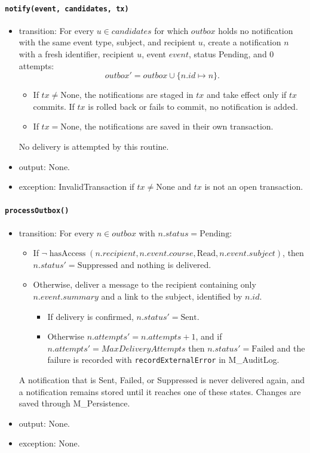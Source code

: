 \documentclass[12pt, titlepage]{article}
\begin{document}
\paragraph{\texttt{notify(event, candidates, tx)}}
\begin{itemize}
    \item transition: For every $u\in candidates$ for which $\mathit{outbox}$ holds no notification with
    the same event type, subject, and recipient $u$, create a notification $n$ with a fresh identifier,
    recipient $u$, event $event$, status Pending, and 0 attempts:
    \[
        \mathit{outbox}'=\mathit{outbox}\cup\{n.id\mapsto n\}.
    \]
    \begin{itemize}
        \item If $tx\ne\text{None}$, the notifications are staged in $tx$ and take effect only if $tx$ commits.
        If $tx$ is rolled back or fails to commit, no notification is added.
        \item If $tx=\text{None}$, the notifications are saved in their own transaction.
    \end{itemize}
    No delivery is attempted by this routine.
    \item output: None.
    \item exception: InvalidTransaction if $tx\ne\text{None}$ and $tx$ is not an open transaction.
\end{itemize}

\paragraph{\texttt{processOutbox()}}
\begin{itemize}
    \item transition: For every $n\in\mathit{outbox}$ with $n.status=\text{Pending}$:
    \begin{itemize}
        \item If $\neg\operatorname{hasAccess}(n.recipient,n.event.course,\text{Read},n.event.subject)$,
        then $n.status'=\text{Suppressed}$ and nothing is delivered.
        \item Otherwise, deliver a message to the recipient containing only $n.event.summary$ and a link to the subject,
        identified by $n.id$.
        \begin{itemize}
            \item If delivery is confirmed, $n.status'=\text{Sent}$.
            \item Otherwise $n.attempts'=n.attempts+1$, and if $n.attempts'=\mathit{MaxDeliveryAttempts}$
            then $n.status'=\text{Failed}$ and the failure is recorded with \texttt{recordExternalError} in M\_AuditLog.
        \end{itemize}
    \end{itemize}
    A notification that is Sent, Failed, or Suppressed is never delivered again, and a notification remains stored
    until it reaches one of these states. Changes are saved through M\_Persistence.
    \item output: None.
    \item exception: None.
\end{itemize}
\end{document}
